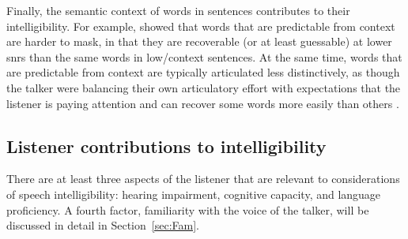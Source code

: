 Finally, the semantic context of words in sentences contributes to their intelligibility.  For example, \citet{LewisEtAl1988} showed that words that are predictable from context are harder to mask, in that they are recoverable (or at least guessable) at lower \ac{snr}s than the same words in low\-/context sentences.  At the same time, words that are predictable from context are typically articulated less distinctively, as though the talker were balancing their own articulatory effort with expectations that the listener is paying attention and can recover some words more easily than others \citep{Lindblom1990, Wright2004a}.



\subsection{Listener contributions to intelligibility\label{sec:Listener}}
There are at least three aspects of the listener that are relevant to considerations of speech intelligibility: hearing impairment, cognitive capacity, and language proficiency.  A fourth factor, familiarity with the voice of the talker, will be discussed in detail in Section~\ref{sec:Fam}.  

